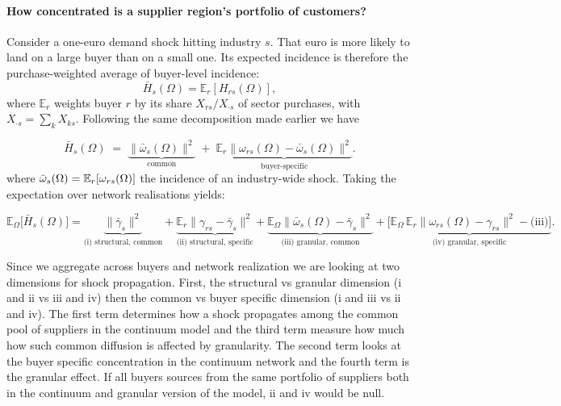 \paragraph{How concentrated is a supplier region's portfolio of customers?}

Consider a one-euro demand shock hitting industry $s$. That euro is more likely to land on a large buyer than on a small one. Its expected incidence is therefore the purchase-weighted average of buyer-level incidence:
\begin{equation*}
\bar H_{s}(\Omega)=\mathbb{E}_{r}[H_{rs}(\Omega)],
\end{equation*}
where $\mathbb{E}_{r}$ weights buyer $r$ by its share $X_{rs}/X_{\cdot s}$ of sector purchases, with $X_{\cdot s}=\sum_{k}X_{ks}$. Following the same decomposition made earlier we have 

\begin{equation}
\bar H_{s}(\Omega)\;=\;\underbrace{\big\|\bar\omega_{s}(\Omega)\big\|^{2}}_{\text{common}}
\;+\;\underbrace{\mathbb{E}_{r}\big\|\omega_{rs}(\Omega)-\bar\omega_{s}(\Omega)\big\|^{2}}_{\text{buyer-specific}}.
\label{eq:incidence_identity}
\end{equation}
where $\Bar{\omega}_s(\Omega) = \mathbb{E}_r[\omega_{rs}(\Omega)]$ the incidence of an industry-wide shock. Taking the expectation over network realisations yields: 

\begin{equation}
\mathbb{E}_{\Omega}\big[\bar H_{s}(\Omega)\big]
=\underbrace{\big\|\bar\gamma_{s}\big\|^{2}}_{\text{(i) structural, common}}
+\underbrace{\mathbb{E}_{r}\big\|\gamma_{rs}-\bar\gamma_{s}\big\|^{2}}_{\text{(ii) structural, specific}}
+\underbrace{\mathbb{E}_{\Omega}\big\|\bar\omega_{s}(\Omega)-\bar\gamma_{s}\big\|^{2}}_{\text{(iii) granular, common}}
+\underbrace{\Big[\mathbb{E}_{\Omega}\,\mathbb{E}_{r}\big\|\omega_{rs}(\Omega)-\gamma_{rs}\big\|^{2}-\text{(iii)}\Big]}_{\text{(iv) granular, specific}} .
\label{eq:four_cells}
\end{equation}

Since we aggregate across buyers and network realization we are looking at two dimensions for shock propagation. First, the structural vs granular dimension (i and ii vs iii and iv) then the common vs buyer specific dimension (i and iii vs ii and iv). The first term determines how a shock propagates among the common pool of suppliers in the continuum model and the third term measure how much how such common diffusion is affected by granularity. The second term looks at the buyer specific concentration in the continuum network and the fourth term is the granular effect. If all buyers sources from the same portfolio of suppliers both in the continuum and granular version of the model, ii and iv would be null. \\

